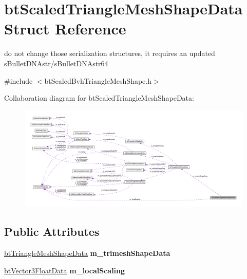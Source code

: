 \hypertarget{structbtScaledTriangleMeshShapeData}{}\section{bt\+Scaled\+Triangle\+Mesh\+Shape\+Data Struct Reference}
\label{structbtScaledTriangleMeshShapeData}


do not change those serialization structures, it requires an updated s\+Bullet\+D\+N\+Astr/s\+Bullet\+D\+N\+Astr64  




{\ttfamily \#include $<$bt\+Scaled\+Bvh\+Triangle\+Mesh\+Shape.\+h$>$}



Collaboration diagram for bt\+Scaled\+Triangle\+Mesh\+Shape\+Data\+:
\nopagebreak
\begin{figure}[H]
\begin{center}
\leavevmode
\includegraphics[width=350pt]{structbtScaledTriangleMeshShapeData__coll__graph}
\end{center}
\end{figure}
\subsection*{Public Attributes}
\begin{DoxyCompactItemize}
\item 
\mbox{\label{structbtScaledTriangleMeshShapeData_a1901d68b68ffa98556d3c2d5afa4bd16}} 
\hyperlink{structbtTriangleMeshShapeData}{bt\+Triangle\+Mesh\+Shape\+Data} {\bfseries m\+\_\+trimesh\+Shape\+Data}
\item 
\mbox{\label{structbtScaledTriangleMeshShapeData_a7524371453a1b12773a65828840f4950}} 
\hyperlink{structbtVector3FloatData}{bt\+Vector3\+Float\+Data} {\bfseries m\+\_\+local\+Scaling}
\end{DoxyCompactItemize}


